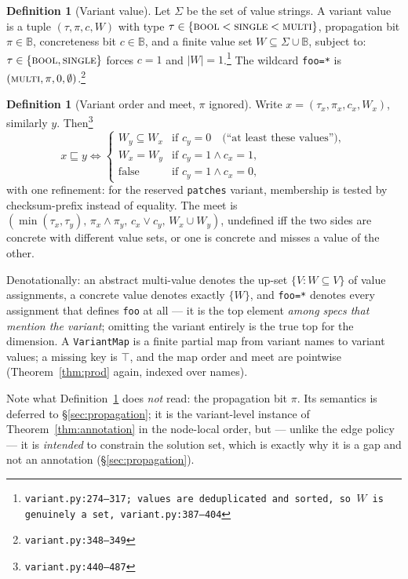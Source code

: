 \documentclass[11pt]{article}
\theoremstyle{definition}
\newtheorem{definition}[theorem]{Definition}
\theoremstyle{remark}
\newcommand{\sat}{\sqsubseteq}
\newcommand{\code}[1]{\texttt{#1}}
\newcommand{\src}[1]{\footnote{\code{#1}}}
\newcommand{\Bool}{\mathbb{B}}
\begin{document}
\begin{definition}[Variant value]\label{def:variant}
Let $\Sigma$ be the set of value strings.  A variant value is a tuple
$(\tau, \pi, c, W)$ with type $\tau \in \{\textsc{bool} < \textsc{single} <
\textsc{multi}\}$, propagation bit $\pi \in \Bool$, concreteness bit
$c \in \Bool$, and a finite value set $W \subseteq \Sigma \cup \Bool$,
subject to: $\tau \in \{\textsc{bool}, \textsc{single}\}$ forces $c = 1$ and
$|W| = 1$.\src{variant.py:274--317; values are deduplicated and sorted, so
$W$ is genuinely a set, variant.py:387--404}  The wildcard \code{foo=*} is
$(\textsc{multi}, \pi, 0, \emptyset)$.\src{variant.py:348--349}
\end{definition}

\begin{definition}[Variant order and meet, $\pi$ ignored]\label{def:variantorder}
Write $x = (\tau_x, \pi_x, c_x, W_x)$, similarly $y$.  Then\src{variant.py:440--487}
\[
  x \sat y \iff
  \begin{cases}
    W_y \subseteq W_x & \text{if } c_y = 0 \quad\text{(``at least these values'')},\\
    W_x = W_y         & \text{if } c_y = 1 \wedge c_x = 1,\\
    \text{false}      & \text{if } c_y = 1 \wedge c_x = 0,
  \end{cases}
\]
with one refinement: for the reserved \code{patches} variant, membership is
tested by checksum-prefix instead of equality.  The meet is
$(\min(\tau_x,\tau_y),\, \pi_x \wedge \pi_y,\, c_x \vee c_y,\, W_x \cup W_y)$,
undefined iff the two sides are concrete with different value sets, or one is
concrete and misses a value of the other.
\end{definition}

Denotationally: an abstract multi-value denotes the up-set
$\{V : W \subseteq V\}$ of value assignments, a concrete value denotes exactly
$\{W\}$, and \code{foo=*} denotes every assignment that defines \code{foo} at
all --- it is the top element \emph{among specs that mention the variant};
omitting the variant entirely is the true top for the dimension.
A \code{VariantMap} is a finite partial map from variant names to variant
values; a missing key is $\top$, and the map order and meet are pointwise
(Theorem~\ref{thm:prod} again, indexed over names).

Note what Definition~\ref{def:variantorder} does \emph{not} read: the
propagation bit $\pi$.  Its semantics is deferred to \S\ref{sec:propagation};
it is the variant-level instance of Theorem~\ref{thm:annotation} in the
node-local order, but --- unlike the edge policy --- it is \emph{intended} to
constrain the solution set, which is exactly why it is a gap and not an
annotation (\S\ref{sec:propagation}).
\end{document}
